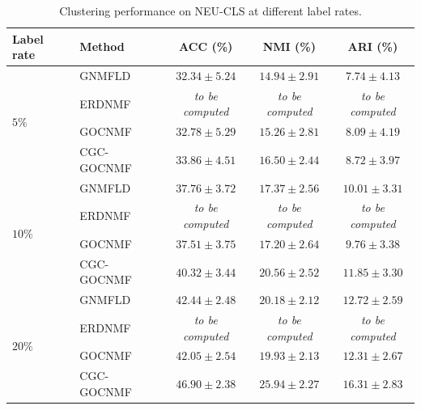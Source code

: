 \begin{table}[t]
\centering
\caption{Clustering performance on NEU-CLS at different label rates.}
\label{tab:neu_results}
\small
\begin{tabular}{llccc}
\hline
Label rate & Method & ACC (\%) & NMI (\%) & ARI (\%) \\
\hline
\multirow{4}{*}{\(5\%\)}
& GNMFLD      & \(32.34\pm5.24\) & \(14.94\pm2.91\) & \(7.74\pm4.13\) \\
& ERDNMF      & \textit{to be computed} & \textit{to be computed} & \textit{to be computed} \\
& GOCNMF      & \(32.78\pm5.29\) & \(15.26\pm2.81\) & \(8.09\pm4.19\) \\
& CGC-GOCNMF  & \(\mathbf{33.86\pm4.51}\) & \(\mathbf{16.50\pm2.44}\) & \(\mathbf{8.72\pm3.97}\) \\
\hline
\multirow{4}{*}{\(10\%\)}
& GNMFLD      & \(37.76\pm3.72\) & \(17.37\pm2.56\) & \(10.01\pm3.31\) \\
& ERDNMF      & \textit{to be computed} & \textit{to be computed} & \textit{to be computed} \\
& GOCNMF      & \(37.51\pm3.75\) & \(17.20\pm2.64\) & \(9.76\pm3.38\) \\
& CGC-GOCNMF  & \(\mathbf{40.32\pm3.44}\) & \(\mathbf{20.56\pm2.52}\) & \(\mathbf{11.85\pm3.30}\) \\
\hline
\multirow{4}{*}{\(20\%\)}
& GNMFLD      & \(42.44\pm2.48\) & \(20.18\pm2.12\) & \(12.72\pm2.59\) \\
& ERDNMF      & \textit{to be computed} & \textit{to be computed} & \textit{to be computed} \\
& GOCNMF      & \(42.05\pm2.54\) & \(19.93\pm2.13\) & \(12.31\pm2.67\) \\
& CGC-GOCNMF  & \(\mathbf{46.90\pm2.38}\) & \(\mathbf{25.94\pm2.27}\) & \(\mathbf{16.31\pm2.83}\) \\
\hline
\end{tabular}
\end{table}
